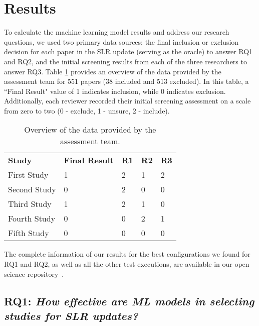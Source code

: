\section{Results}
\label{sec:results}

To calculate the machine learning model results and address our research questions, we used two primary data sources: the final inclusion or exclusion decision for each paper in the SLR update (serving as the oracle) to answer RQ1 and RQ2, and the initial screening results from each of the three researchers to answer RQ3. Table \ref{tab:slr-update-results-sample} provides an overview of the data provided by the assessment team for 551 papers (38 included and 513 excluded). In this table, a ``Final Result" value of 1 indicates inclusion, while 0 indicates exclusion. Additionally, each reviewer recorded their initial screening assessment on a scale from zero to two (0 - exclude, 1 - unsure, 2 - include).

\begin{table}[!ht]
\scriptsize
\caption{Overview of the data provided by the assessment team.}
\begin{center}
\begin{tabular}{ m{1.8cm} m{1.5cm} m{1cm} m{1cm} m{1cm} } 
 \hline 
  \textbf{Study} & \textbf{Final Result} & \textbf{R1} & \textbf{R2} & \textbf{R3} \\
 First Study & 1 & 2 & 1 & 2 \\ 
 Second Study & 0 & 2 & 0 & 0 \\ 
 Third Study & 1 & 2 & 1 & 0 \\ 
 Fourth Study & 0 & 0 & 2 & 1 \\ 
 Fifth Study & 0 & 0 & 0 & 0 \\
 \end{tabular}
\end{center}
 \label{tab:slr-update-results-sample}
\end{table}

The complete information of our results for the best configurations we found for RQ1 and RQ2, as well as all the other test executions, are available in our open science repository~\cite{zenodoOpenScience}. 

\subsection{RQ1: \textit{How effective are ML models in selecting studies for SLR updates?}}
\label{results:RQ1}

